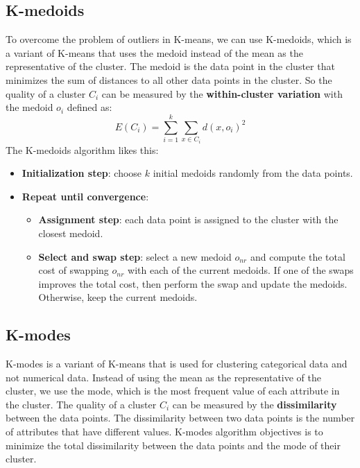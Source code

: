 \documentclass[12pt, openany]{report}
\theoremstyle{definition}
\begin{document}
\subsection{K-medoids}
To overcome the problem of outliers in K-means, we can use K-medoids, which is a variant of K-means that uses the medoid instead of the mean as the representative of the cluster. The medoid is the data point in the cluster that minimizes the sum of distances to all other data points in the cluster. So the quality of a cluster $C_i$ can be measured by the \textbf{within-cluster variation} with the medoid $o_i$ defined as:
\begin{equation}
    E(C_i) = \sum_{i=1}^{k}\sum_{x \in C_i} d(x, o_i)^2
\end{equation}
The K-medoids algorithm likes this:
\begin{itemize}
    \item \textbf{Initialization step}: choose $k$ initial medoids randomly from the data points.
    \item \textbf{Repeat until convergence}:
    \begin{itemize}        
        \item \textbf{Assignment step}: each data point is assigned to the cluster with the closest medoid.
        \item \textbf{Select and swap step}: select a new medoid $o_{nr}$ and compute the total cost of swapping $o_{nr}$ with each of the current medoids. If one of the swaps improves the total cost, then perform the swap and update the medoids. Otherwise, keep the current medoids.
    \end{itemize}
\end{itemize}
\subsection{K-modes}
K-modes is a variant of K-means that is used for clustering categorical data and not numerical data. Instead of using the mean as the representative of the cluster, we use the mode, which is the most frequent value of each attribute in the cluster. The quality of a cluster $C_i$ can be measured by the \textbf{dissimilarity} between the data points. The dissimilarity between two data points is the number of attributes that have different values. K-modes algorithm objectives is to minimize the total dissimilarity between the data points and the mode of their cluster. 
\end{document}
